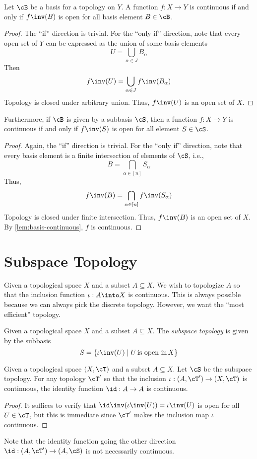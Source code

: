 \documentclass{amsart}
\begin{document}
\begin{lem}\label{lem:basis-continuous}
  Let $\cB$ be a basis for a topology on $Y$.
  A function $f : X \to Y$ is continuous if and only if $f\inv(B)$ is open for all basis element $B \in \cB$.
\end{lem}
\begin{proof}
  The ``if'' direction is trivial.
  For the ``only if'' direction, note that every open set of $Y$ can be expressed as the union of some basis elements
  \[
    U = \bigcup_{\alpha \in J}B_{\alpha}
  \]
  Then
  \[
    f\inv(U) = \bigcup_{\alpha \in J} f\inv(B_{\alpha})
  \]
  Topology is closed under arbitrary union.
  Thus, $f\inv(U)$ is an open set of $X$.
\end{proof}

\begin{lem}
  Furthermore, if $\cB$ is given by a subbasis $\cS$, then a function $f : X \to Y$ is continuous if and only if $f\inv(S)$ is open for all element $S \in \cS$.
\end{lem}
\begin{proof}
  Again, the ``if'' direction is trivial.
  For the ``only if'' direction, note that every basis element is a finite intersection of elements of $\cS$, i.e.,
  \[
    B = \bigcap_{\alpha \in [n]} S_{\alpha}
  \]
  Thus,
  \[
    f\inv(B) = \bigcap_{\alpha \in [n]}f\inv(S_{\alpha})
  \]
  Topology is closed under finite intersection.
  Thus, $f\inv(B)$ is an open set of $X$.
  By \cref{lem:basis-continuous}, $f$ is continuous.
\end{proof}

\section{Subspace Topology}
\label{sec:subspace-topology}

Given a topological space $X$ and a subset $A \subseteq X$.
We wish to topologize $A$ so that the inclusion function $\iota : A \into X$ is continuous.
This is always possible because we can always pick the discrete topology.
However, we want the ``most efficient'' topology.

\begin{defn}
  Given a topological space $X$ and a subset $A \subseteq X$.
  The \emph{subspace topology} is given by the subbasis
  \[
    S = \{\iota\inv(U) \mid U\,\text{is open in}\,X\}
  \]
\end{defn}

\begin{lem}
  Given a topological space $(X, \cT)$ and a subset $A \subseteq X$.
  Let $\cS$ be the subspace topology.
  For any topology $\cT'$ so that the inclusion $\iota : (A, \cT') \to (X, \cT)$ is continuous, the identity function $\id : A \to A$ is continuous.
  
\end{lem}
\begin{proof}
  It suffices to verify that $\id\inv(\iota\inv(U)) = \iota\inv(U)$ is open for all $U \in \cT$, but this is immediate since $\cT'$ makes the inclusion map $\iota$ continuous.
\end{proof}
Note that the identity function going the other direction $\id : (A, \cT') \to (A, \cS)$ is not necessarily continuous.
\end{document}
